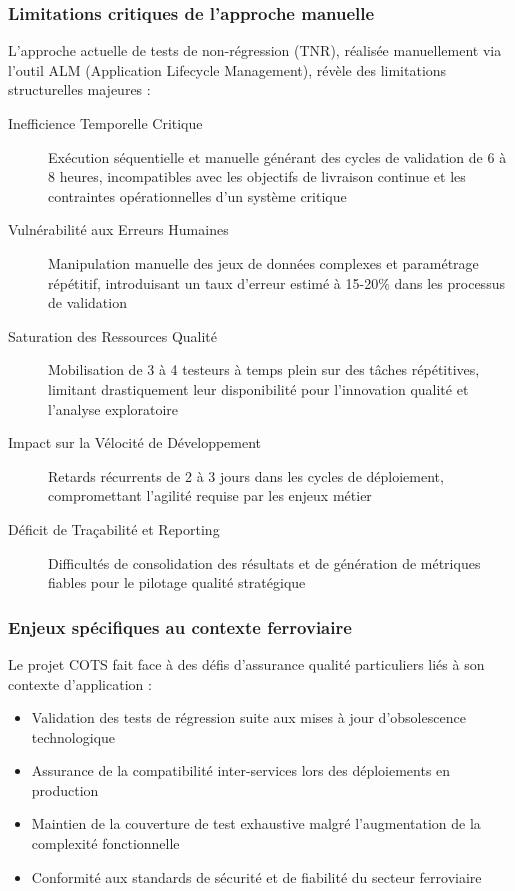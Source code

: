 \subsubsection{Limitations critiques de l'approche manuelle}

L'approche actuelle de tests de non-régression (TNR), réalisée manuellement via l'outil ALM (Application Lifecycle Management), révèle des limitations structurelles majeures :

\begin{description}
    \item[Inefficience Temporelle Critique] Exécution séquentielle et manuelle générant des cycles de validation de 6 à 8 heures, incompatibles avec les objectifs de livraison continue et les contraintes opérationnelles d'un système critique
    \item[Vulnérabilité aux Erreurs Humaines] Manipulation manuelle des jeux de données complexes et paramétrage répétitif, introduisant un taux d'erreur estimé à 15-20\% dans les processus de validation
    \item[Saturation des Ressources Qualité] Mobilisation de 3 à 4 testeurs à temps plein sur des tâches répétitives, limitant drastiquement leur disponibilité pour l'innovation qualité et l'analyse exploratoire
    \item[Impact sur la Vélocité de Développement] Retards récurrents de 2 à 3 jours dans les cycles de déploiement, compromettant l'agilité requise par les enjeux métier
    \item[Déficit de Traçabilité et Reporting] Difficultés de consolidation des résultats et de génération de métriques fiables pour le pilotage qualité stratégique
\end{description}

\subsubsection{Enjeux spécifiques au contexte ferroviaire}

Le projet COTS fait face à des défis d'assurance qualité particuliers liés à son contexte d'application :
\begin{itemize}
    \item Validation des tests de régression suite aux mises à jour d'obsolescence technologique
    \item Assurance de la compatibilité inter-services lors des déploiements en production
    \item Maintien de la couverture de test exhaustive malgré l'augmentation de la complexité fonctionnelle
    \item Conformité aux standards de sécurité et de fiabilité du secteur ferroviaire
\end{itemize}

